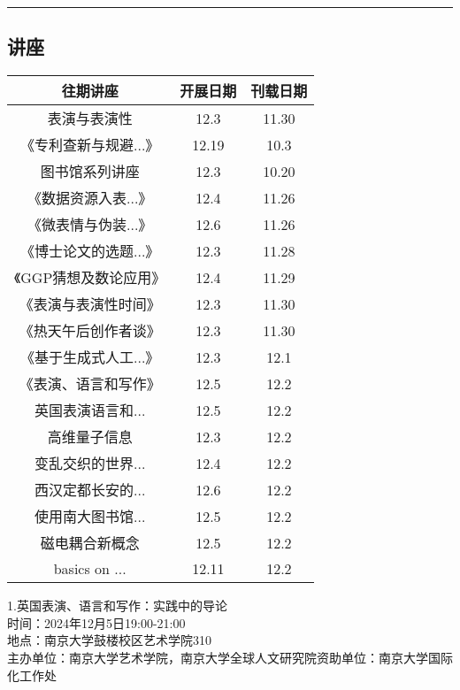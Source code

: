 \documentclass[letterpaper, 12pt]{article}
\begin{document}
\hrule
\pagebreak
\begin{multicols}{2}

\section{讲座}
\begin{tabular}{|c|c|c|}
    \hline
    往期讲座 & 开展日期 & 刊载日期\\
    \hline\hline
    表演与表演性 & 12.3 & 11.30\\
    《专利查新与规避...》 & 12.19 & 10.3\\
    图书馆系列讲座 & 12.3 & 10.20\\
    《数据资源入表...》 & 12.4 & 11.26\\
    《微表情与伪装...》 & 12.6 & 11.26\\
    《博士论文的选题...》 & 12.3 & 11.28\\
    《GGP猜想及数论应用》 & 12.4 & 11.29\\
    《表演与表演性时间》 & 12.3 & 11.30\\
    《热天午后创作者谈》 & 12.3 & 11.30\\
    《基于生成式人工...》 & 12.3 & 12.1\\
    《表演、语言和写作》 & 12.5 & 12.2\\
    英国表演语言和... & 12.5 & 12.2\\
    高维量子信息 & 12.3 & 12.2\\
    变乱交织的世界... & 12.4 & 12.2\\
    西汉定都长安的... & 12.6 & 12.2\\
    使用南大图书馆... & 12.5 & 12.2\\
    磁电耦合新概念 & 12.5 & 12.2\\
    basics on ... & 12.11 & 12.2\\
    \hline
\end{tabular}

1.英国表演、语言和写作：实践中的导论\\
时间：2024年12月5日19:00-21:00\\
地点：南京大学鼓楼校区艺术学院310\\
主办单位：南京大学艺术学院，南京大学全球人文研究院资助单位：南京大学国际化工作处\\



\end{multicols}
\end{document}
